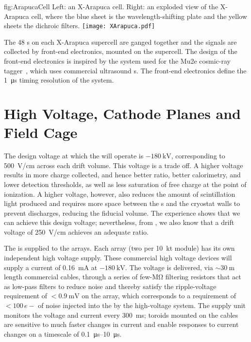 \begin{dunefigure}{fig:ArapucaCell}
{Left: an X-Arapuca cell. Right: an exploded view of the X-Arapuca cell, where the blue sheet is the wavelength-shifting plate and the yellow sheets the dichroic filters.}
\texttt{[image: XArapuca.pdf]}
\end{dunefigure}

The 48 s on each X-Arapuca supercell are ganged together and the signals are collected by front-end electronics, mounted on the supercell. The design of the front-end electronics is inspired by the system used for the Mu2e cosmic-ray tagger~\cite{bib:mu2e_tdr}, which uses commercial ultrasound s. The front-end electronics define the \SI{1}{\micro\second} timing resolution of the  system.

\section{High Voltage, Cathode Planes and Field Cage}
\label{sec:fdsp-exec-hv}

The design voltage at which the   will operate is $-\SI{180}{\kilo\volt}$, corresponding to \SI{500}{\volt/\cm} across each drift volume. This voltage is a trade off. A higher voltage results in more charge collected, and hence better  ratio, better calorimetry, and lower detection thresholds, as well as less saturation of free charge at the point of ionization. A higher voltage, however, also reduces the amount of scintillation light produced and requires more space between the s and the cryostat walls to prevent discharges, reducing the fiducial volume. The  experience shows that we can achieve this design voltage; nevertheless, from , we also know that a drift voltage of \SI{250}{\volt/\cm} achieves an adequate  ratio.

The  is supplied to the  arrays. Each  array (two per \SI{10}{\kilo\tonne} module) has its own independent high voltage supply. These commercial high voltage devices will supply a current of \SI{0.16}{\milli\ampere} at $-\SI{180}{\kilo\volt}$. The voltage is delivered, via $\sim\!\SI{30}{\meter}$ length commercial cables, through a series of few-\si{\mega\ohm} filtering resistors that act as low-pass filters to reduce noise and thereby satisfy the ripple-voltage requirement of $<\!\SI{0.9}{\milli\volt}$ on the  array, which corresponds to a requirement of $<\!100\,e{-}$ of noise injected into the  by the high-voltage system. The supply unit monitors the voltage and current every \SI{300}{\milli\second}; toroids mounted on the cables are sensitive to much faster changes in current and enable responses to current changes on a timescale of \SIrange{0.1}{10}{\micro\second}.

